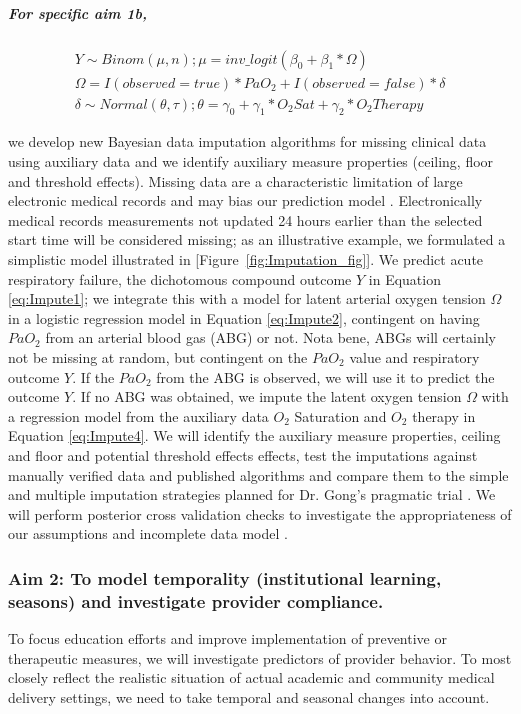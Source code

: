 \documentclass[11pt,notitlepage]{article}
\begin{document}
\subparagraph*{For specific aim 1b,} \begin{figure}
\vspace{-25pt}
\begin{align} \label{eq:Impute1}
Y \sim Binom(\mu, n); \mu = inv\_logit(\beta_{0} + \beta_{1} * \Omega) \\ \label{eq:Impute2}
\Omega =  I(observed = true) * PaO_{2}   +   I(observed = false) * \delta  \\ 
\delta \sim Normal(\theta, \tau); \theta = \gamma_{0} + \gamma_{1}* O_{2} Sat + \gamma_{2} * O_{2} Therapy \label{eq:Impute4}
\end{align}
\vspace{-35pt}
\end{figure}we develop new Bayesian data imputation algorithms for missing clinical data using auxiliary data and we identify auxiliary measure properties (ceiling, floor and threshold effects). Missing data are a characteristic limitation of large electronic medical records and may bias our prediction model \cite{Dean_19279318}. Electronically medical records measurements not updated 24 hours earlier than the selected start time will be considered missing;  as an illustrative example, we formulated a simplistic model illustrated in [Figure~\ref{fig:Imputation_fig}]. We predict acute respiratory failure, the dichotomous compound outcome $Y$ in Equation \ref{eq:Impute1}; we integrate this with a model for latent arterial oxygen tension $\Omega$ in a logistic regression model in Equation \ref{eq:Impute2}, contingent on having $PaO_{2}$ from an arterial blood gas (ABG) or not. Nota bene, ABGs will certainly not be missing at random, but contingent on the $PaO_2$ value and respiratory outcome $Y$. If the $PaO_{2}$ from the ABG is observed, we will use it to predict the outcome $Y$. If no ABG was obtained, we impute the latent oxygen tension $\Omega$ with a regression model from the auxiliary data  $O_{2}$ Saturation and $O_{2}$ therapy in Equation \ref{eq:Impute4}. We will identify the auxiliary measure properties, ceiling and floor and potential threshold effects effects, test the imputations against manually verified data and published algorithms and compare them to the simple and multiple imputation strategies planned for Dr. Gong's pragmatic trial \cite{Huntington_16311133,Sloan_15027501}.  We will perform posterior cross validation checks to investigate the appropriateness of our assumptions and incomplete data model \cite{Gelman1998notasked}.

\subsubsection*{Aim 2: To model temporality (institutional learning, seasons) and investigate provider compliance.}
To focus education efforts and improve implementation of preventive or therapeutic measures, we will investigate predictors of provider behavior. To most closely reflect the realistic situation of actual academic and community medical delivery settings, we need to take temporal and seasonal changes into account. 
  
\end{document}

